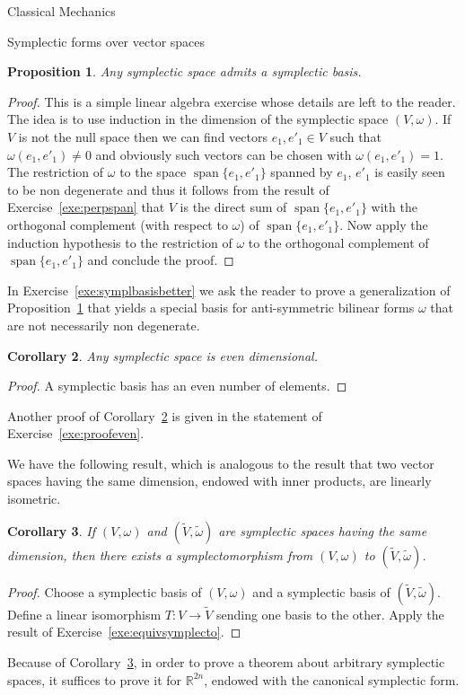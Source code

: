 \documentclass[oneside,a4paper,11pt]{amsbook}
\newcommand{\R}{\mathds R}
\DeclareMathOperator{\Span}{span}
\theoremstyle{remark}\newtheorem{exercise}{Exercise}[chapter]
\theoremstyle{plain}\newtheorem{teo}{Theorem}[section]
\theoremstyle{plain}\newtheorem{lem}[teo]{Lemma}
\theoremstyle{plain}\newtheorem{prop}[teo]{Proposition}
\theoremstyle{plain}\newtheorem{cor}[teo]{Corollary}
\theoremstyle{definition}\newtheorem{defin}[teo]{Definition}
\theoremstyle{remark}\newtheorem{rem}[teo]{Remark}
\theoremstyle{definition}\newtheorem{notation}[teo]{Notation}
\theoremstyle{definition}\newtheorem{convention}[teo]{Convention}
\theoremstyle{definition}\newtheorem{example}[teo]{Example}
\numberwithin{section}{chapter}
\numberwithin{equation}{section}
\begin{document}
\begin{chapter}{Classical Mechanics}
\begin{section}{Symplectic forms over vector spaces}
\begin{prop}\label{thm:symplbasis}
Any symplectic space admits a symplectic basis.
\end{prop}
\begin{proof}
This is a simple linear algebra exercise whose details are left to the reader. The idea is to use induction
in the dimension of the symplectic space $(V,\omega)$. If $V$ is not the null space then we can find vectors
$e_1,e'_1\in V$ such that $\omega(e_1,e'_1)\ne0$ and obviously such vectors can be chosen with $\omega(e_1,e'_1)=1$.
The restriction of $\omega$ to the space $\Span\{e_1,e'_1\}$ spanned by $e_1$, $e'_1$ is easily seen to be non degenerate
and thus it follows from the result of Exercise~\ref{exe:perpspan} that $V$ is the direct sum of $\Span\{e_1,e'_1\}$
with the orthogonal complement (with respect to $\omega$) of $\Span\{e_1,e'_1\}$. Now apply the induction hypothesis
to the restriction of $\omega$ to the orthogonal complement of $\Span\{e_1,e'_1\}$ and conclude the proof.
\end{proof}
In Exercise~\ref{exe:symplbasisbetter} we ask the reader to prove a generalization of Proposition~\ref{thm:symplbasis}
that yields a special basis for anti-symmetric bilinear forms $\omega$ that are not necessarily non degenerate.

\begin{cor}\label{thm:corsympleven}
Any symplectic space is even dimensional.
\end{cor}
\begin{proof}
A symplectic basis has an even number of elements.
\end{proof}
Another proof of Corollary~\ref{thm:corsympleven} is given in the statement of Exercise~\ref{exe:proofeven}.

\medskip

We have the following result, which is analogous to the result that two vector spaces having the same dimension,
endowed with inner products, are linearly isometric.
\begin{cor}\label{thm:coronlyonesympl}
If $(V,\omega)$ and $(\widetilde V,\tilde\omega)$ are symplectic spaces having the same dimension, then there exists
a symplectomorphism from $(V,\omega)$ to $(\widetilde V,\tilde\omega)$.
\end{cor}
\begin{proof}
Choose a symplectic basis of $(V,\omega)$ and a symplectic basis of $(\widetilde V,\tilde\omega)$. Define a linear isomorphism
$T:V\to\widetilde V$ sending one basis to the other. Apply the result of Exercise~\ref{exe:equivsymplecto}.
\end{proof}
Because of Corollary~\ref{thm:coronlyonesympl}, in order to prove a theorem about arbitrary symplectic spaces, it suffices
to prove it for $\R^{2n}$, endowed with the canonical symplectic form.


\end{section}
\end{chapter}
\end{document}
